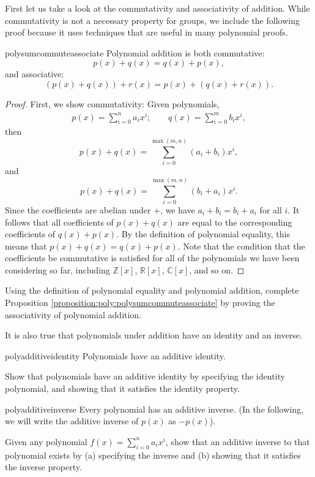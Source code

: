 First let us take a look at the commutativity and associativity of addition.  While commutativity is not a necessary property for groups, we include the following proof because it uses techniques that are useful in many polynomial proofs.

\begin {prop}{polysumcommuteassociate} Polynomial addition is both commutative: 
	\[p(x)+q(x) = q(x) + p(x),\]	
and associative:	
	\[(p(x) + q(x)) + r(x)  = p(x) + (q(x) + r(x)).\]	
\end {prop}
\begin {proof}{}
First, we show commutativity:	
Given polynomials,
\begin{align*}
p(x)  = \sum^{n}_{i=0} a_i x^i; \qquad
q(x)  = \sum^{m}_{i=0} b_i x^i,
\end{align*}	
then 
\[
p(x) + q(x) =  \sum_{i=0}^{\max(m,n)} (a_i + b_i) x^i,
\]
and
\[
p(x) + q(x) =  \sum_{i=0}^{\max(m,n)} (b_i + a_i) x^i.
\]
Since the coefficients are abelian under +, we have $a_i + b_i = b_i + a_i$ for all $i$. It follows that all coefficients of $p(x) + q(x)$ are equal to the corresponding coefficients of $q(x) + p(x)$. By the definition of polynomial equality, this means that 
$p(x) + q(x) = q(x) + p(x)$.  Note that the condition that the coefficients be commutative is satisfied for all of the polynomials we have been considering so far, including $\mathbb{Z}[x]$, $\mathbb{R}[x]$, $\mathbb{C}[x]$, and so on.

\end {proof}

\begin {exercise}{}
Using the definition of polynomial equality and polynomial addition, complete Proposition \ref{proposition:poly:polysumcommuteassociate} by proving the associativity of polynomial addition.
\end {exercise}

It is also true that polynomials under addition have an identity and an inverse.

\begin {prop}{polyadditiveidentity} Polynomials have an additive identity.
\end{prop}
\begin{exercise}{}
Show that polynomials have an additive identity by specifying the identity polynomial, and showing that it satisfies the identity property.
\end{exercise}

\begin{prop}{polyadditiveinverse} Every polynomial has an additive inverse.  (In the following, we will write the additive inverse of $p(x)$ as $-p(x)$).
\end{prop}
\begin{exercise}{}
Given any polynomial $f(x) = \sum_{i=0}^{n} a_i x^i$, show that an additive inverse to that polynomial exists by (a) specifying the inverse and (b) showing that it satisfies the inverse property.
\end{exercise}

